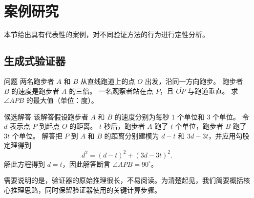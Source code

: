 \documentclass[11pt]{article}
\begin{document}
\section{案例研究}
\label{sec:appendix_case}

本节给出具有代表性的案例，对不同验证方法的行为进行定性分析。

\subsection{生成式验证器}

\begin{exbox}{问题}
两名跑步者 $A$ 和 $B$ 从直线跑道上的点 $O$ 出发，沿同一方向跑步。
跑步者 $B$ 的速度是跑步者 $A$ 的三倍。
一名观察者站在点 $P$，且 $\overline{OP}$ 与跑道垂直。
求 $\angle APB$ 的最大值（单位：度）。
\end{exbox}

\begin{exbox}{候选解答}
该解答假设跑步者 $A$ 和 $B$ 的速度分别为每秒 $1$ 个单位和 $3$ 个单位。
令 $d$ 表示点 $P$ 到起点 $O$ 的距离。
$t$ 秒后，跑步者 $A$ 跑了 $t$ 个单位，跑步者 $B$ 跑了 $3t$ 个单位。
解答把 $P$ 到 $A$ 和 $B$ 的距离分别建模为 $d-t$ 和 $3d-3t$，并应用勾股定理得到
\[
d^2 = (d - t)^2 + (3d - 3t)^2.
\]
解此方程得到 $d=t$，因此解答断言 $\angle APB=90^\circ$。
\end{exbox}

需要说明的是，验证器的原始推理很长，不易阅读。为清楚起见，我们简要概括核心推理思路，同时保留验证器使用的关键计算步骤。
\end{document}
